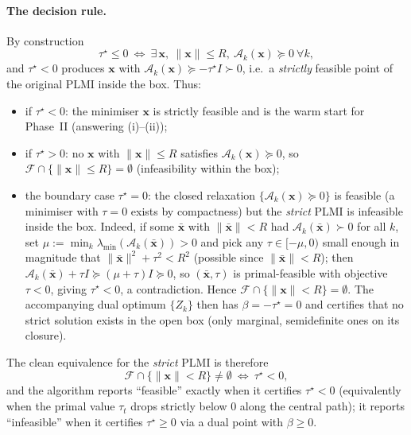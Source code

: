 \documentclass{amsart}
\begin{document}
\paragraph{The decision rule.}
By construction
\[
  \tau^\star\le0\ \Longleftrightarrow\ \exists\,\bm x,\ \|\bm x\|\le R,\ \mathcal A_k(\bm x)\succeq0\ \forall k,
\]
and $\tau^\star<0$ produces $\bm x$ with $\mathcal A_k(\bm x)\succeq-\tau^\star I\succ0$,
i.e.\ a \emph{strictly} feasible point of the original PLMI inside the box. Thus:
\begin{itemize}
\item if $\tau^\star<0$: the minimiser $\bm x$ is strictly feasible and is the warm
start for Phase~II (answering (i)--(ii));
\item if $\tau^\star>0$: no $\bm x$ with $\|\bm x\|\le R$ satisfies $\mathcal A_k(\bm
x)\succeq0$, so $\mathcal F\cap\{\|\bm x\|\le R\}=\emptyset$ (infeasibility within the
box);
\item the boundary case $\tau^\star=0$: the closed relaxation
$\{\mathcal A_k(\bm x)\succeq0\}$ is feasible (a minimiser with $\tau=0$ exists by
compactness) but the \emph{strict} PLMI is infeasible inside the box. Indeed, if some
$\bar{\bm x}$ with $\|\bar{\bm x}\|<R$ had $\mathcal A_k(\bar{\bm x})\succ0$ for all
$k$, set $\mu:=\min_k\lambda_{\min}(\mathcal A_k(\bar{\bm x}))>0$ and pick any
$\tau\in[-\mu,0)$ small enough in magnitude that $\|\bar{\bm x}\|^2+\tau^2<R^2$
(possible since $\|\bar{\bm x}\|<R$); then $\mathcal A_k(\bar{\bm x})+\tau I\succeq
(\mu+\tau)I\succeq0$, so $(\bar{\bm x},\tau)$ is primal-feasible with objective
$\tau<0$, giving $\tau^\star<0$, a contradiction. Hence
$\mathcal F\cap\{\|\bm x\|<R\}=\emptyset$. The accompanying dual optimum
$\{Z_k\}$ then has $\beta=-\tau^\star=0$ and certifies that no strict solution
exists in the open box (only marginal, semidefinite ones on its closure).
\end{itemize}

The clean equivalence for the \emph{strict} PLMI is therefore
\[
  \mathcal F\cap\{\|\bm x\|<R\}\neq\emptyset
  \ \Longleftrightarrow\ \tau^\star<0,
\]
and the algorithm reports ``feasible'' exactly when it certifies $\tau^\star<0$
(equivalently when the primal value $\tau_t$ drops strictly below $0$ along the
central path); it reports ``infeasible'' when it certifies $\tau^\star\ge0$ via a
dual point with $\beta\ge0$.
\end{document}
